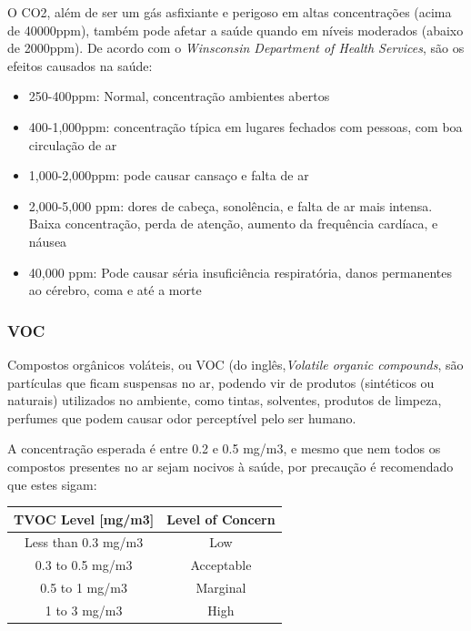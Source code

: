 \documentclass[]{politex}
\begin{document}
O CO2, além de ser um gás asfixiante e perigoso em altas concentrações (acima de 40000ppm), também pode afetar a saúde quando em níveis moderados (abaixo de 2000ppm). 
De acordo com o \textit{Winsconsin Department of Health Services}\cite{Winsconsin}, são os efeitos causados na saúde: 
\begin{itemize}
\item 250-400ppm: Normal, concentração ambientes abertos
\item 400-1,000ppm: concentração típica em lugares fechados com pessoas, com boa circulação de ar
\item 1,000-2,000ppm: pode causar cansaço e falta de ar
\item 2,000-5,000 ppm: dores de cabeça, sonolência, e falta de ar mais intensa. Baixa concentração, perda de atenção, aumento da frequência cardíaca, e náusea
\item 40,000 ppm: Pode causar séria insuficiência respiratória, danos permanentes ao cérebro, coma e até a morte
\end{itemize}

\subsubsection{VOC}
Compostos orgânicos voláteis, ou VOC (do inglês,\textit{Volatile organic compounds}, são partículas que ficam suspensas no ar, podendo vir de produtos (sintéticos ou naturais) utilizados no ambiente, como tintas, solventes, produtos de limpeza, perfumes que podem causar odor perceptível pelo ser humano\cite{AirQuality}.

A concentração esperada é entre 0.2 e 0.5 mg/m3, e mesmo que nem todos os compostos presentes no ar sejam nocivos à saúde, por precaução é recomendado que estes sigam: \cite{tecam}

\begin{tabular}{ |c|c| }
\hline
TVOC Level [mg/m3]	&   Level of Concern \\
\hline
Less than 0.3 mg/m3	 &  Low \\
0.3 to 0.5 mg/m3	&   Acceptable \\
0.5 to 1 mg/m3	 &  Marginal \\
1 to 3 mg/m3	 &  High \\
\hline
\end{tabular}

\end{document}
